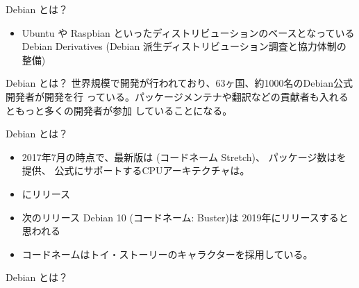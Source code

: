 \begin{frame}{Debian とは？}

\begin{minipage}{0.45\hsize}
  \begin{itemize}
  \item Ubuntu や Raspbian といったディストリビューションのベースとなっている \\
	Debian Derivatives (Debian 派生ディストリビューション調査と協力体制の整備)
  \end{itemize}
\end{minipage} 
\begin{minipage}{0.45\hsize}
 \begin{center} 
 \end{center}
\end{minipage}

\end{frame}


\begin{frame}{Debian とは？}
 世界規模で開発が行われており、63ヶ国、約1000名のDebian公式開発者が開発を行
 っている。パッケージメンテナや翻訳などの貢献者も入れるともっと多くの開発者が参加
 していることになる。
 \begin{center}
 \end{center}
\end{frame}


\begin{frame}{Debian とは？}
\begin{itemize}[<+->]
 \item 2017年7月の時点で、\pause 最新版は {\color{red}{Debian 9.0}} (コードネーム Stretch)、\pause
 パッケージ数は{\color{red}{約51000}}を提供、\pause
 公式にサポートするCPUアーキテクチャは{\color{red}{10}}。\pause
 \item {\color{red}{約2年毎}}にリリース
 \item 次のリリース Debian 10 (コードネーム: {\color{red}{}}Buster)は 2019年にリリースすると思われる
 \item コードネームはトイ・ストーリーのキャラクターを採用している。
\end{itemize}
\end{frame}


\begin{frame}{Debian とは？}
  \begin{center}
  \end{center}
\end{frame}

